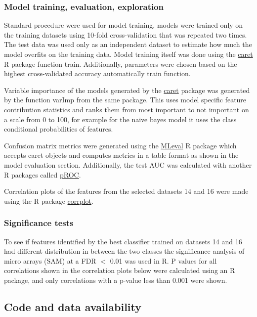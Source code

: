 \subsubsection{Model training, evaluation, exploration}

Standard procedure were used for model training, models were trained only on the training datasets using 10-fold cross-validation that was repeated two times.
The test data was used only as an independent dataset to estimate how much the model overfits on the training data.
Model training itself was done using the \href{https://topepo.github.io/caret/}{caret} R package function train.
Additionally, parameters were chosen based on the highest cross-validated accuracy automatically train function.

Variable importance of the models generated by the \href{https://topepo.github.io/caret/}{caret} package was generated by the function varImp from the same package.
This uses model specific feature contribution statistics and ranks them from most important to not important on a scale from 0 to 100, for example for the naive bayes model it uses the class conditional probabilities of features.

Confusion matrix metrics were generated using the \href{https://cran.r-project.org/web/packages/MLeval/index.html}{MLeval} R package which accepts caret objects and computes metrics in a table format as shown in the model evaluation section.
Additionally, the test AUC was calculated with another R packages called \href{https://cran.r-project.org/web/packages/pROC/pROC.pdf}{pROC}.

Correlation plots of the features from the selected datasets 14 and 16 were made using the R package \href{https://cran.r-project.org/web/packages/corrplot/vignettes/corrplot-intro.html}{corrplot}.

\subsubsection{Significance tests}

To see if features identified by the best classifier trained on datasets 14 and 16 had different distribution in between the two classes the significance analysis of micro arrays (SAM) at a FDR \(<\) 0.01 was used in R.
P values for all correlations shown in the correlation plots below were calculated using an R package, and only correlations with a p-value less than 0.001 were shown.

\subsection{Code and data availability}\label{sec:github}

